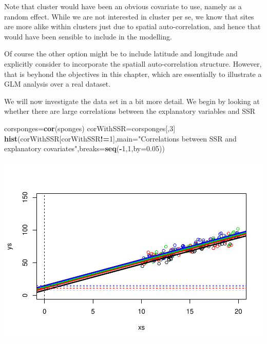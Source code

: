 \documentclass[
]{book}
\newenvironment{Shaded}{\begin{snugshade}}{\end{snugshade}}
\newcommand{\AttributeTok}[1]{\textcolor[rgb]{0.13,0.29,0.53}{#1}}
\newcommand{\DecValTok}[1]{\textcolor[rgb]{0.00,0.00,0.81}{#1}}
\newcommand{\FloatTok}[1]{\textcolor[rgb]{0.00,0.00,0.81}{#1}}
\newcommand{\FunctionTok}[1]{\textcolor[rgb]{0.13,0.29,0.53}{\textbf{#1}}}
\newcommand{\NormalTok}[1]{#1}
\newcommand{\OtherTok}[1]{\textcolor[rgb]{0.56,0.35,0.01}{#1}}
\newcommand{\SpecialCharTok}[1]{\textcolor[rgb]{0.81,0.36,0.00}{\textbf{#1}}}
\newcommand{\StringTok}[1]{\textcolor[rgb]{0.31,0.60,0.02}{#1}}
\begin{document}
Note that cluster would have been an obvious covariate to use, namely as a random effect. While we are not interested in cluster per se, we know that sites are more alike within clusters just due to spatial auto-correlation, and hence that would have been sensible to include in the modelling.

Of course the other option might be to include latitude and longitude and explicitly consider to incorporate the spatiall auto-correlation structure. However, that is beyhond the objectives in this chapter, which are essentially to illustrate a GLM analysis over a real dataset.

We will now investigate the data set in a bit more detail. We begin by looking at whether there are large correlations between the explanatory variables and SSR

\begin{Shaded}
\begin{Highlighting}[]
\NormalTok{corsponges}\OtherTok{=}\FunctionTok{cor}\NormalTok{(sponges)}
\NormalTok{corWithSSR}\OtherTok{=}\NormalTok{corsponges[,}\DecValTok{3}\NormalTok{]}
\FunctionTok{hist}\NormalTok{(corWithSSR[corWithSSR}\SpecialCharTok{!=}\DecValTok{1}\NormalTok{],}\AttributeTok{main=}\StringTok{"Correlations between SSR and explanatory covariates"}\NormalTok{,}\AttributeTok{breaks=}\FunctionTok{seq}\NormalTok{(}\SpecialCharTok{{-}}\DecValTok{1}\NormalTok{,}\DecValTok{1}\NormalTok{,}\AttributeTok{by=}\FloatTok{0.05}\NormalTok{))}
\end{Highlighting}
\end{Shaded}

\includegraphics{ECOMODbook_files/figure-latex/unnamed-chunk-87-1.pdf}
\end{document}
